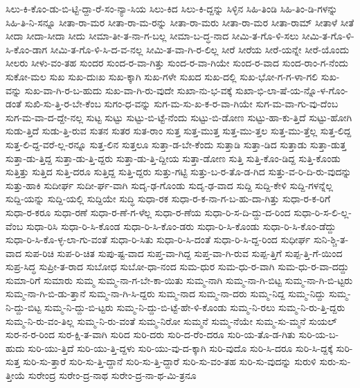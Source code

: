 {ಸಿಲು-ಕಿ-ಕೊಂ-ಡು-ಬಿ-ಟ್ಟಿ-ದ್ದಾ-ರೆ-ಸಂ-ನ್ಯಾ-ಸಿಯ
ಸಿಲು-ಕಿದ
ಸಿಲು-ಕಿ-ದ್ದನ್ನು
ಸಿಳ್ಳಿನ
ಸಿಹಿ-ತಿಂಡಿ
ಸಿಹಿ-ತಿಂ-ಡಿ-ಗಳನ್ನು
ಸಿಹಿ-ತಿ-ನಿ-ಸನ್ನೂ
ಸೀತಾ-ರಾ-ಮರ
ಸೀತಾ-ರಾ-ಮ-ರನ್ನು
ಸೀತಾ-ರಾ-ಮರು
ಸೀತಾ-ರಾ-ಮರ
ಸೀತಾ-ರಾಮ್
ಸೀತಾಳೆ
ಸೀತೆ
ಸೀದಾ
ಸೀದಾ-ಸೀದಾ
ಸೀದು
ಸೀಮಾ-ತೀ-ತ-ನಾ-ಗ-ಬಲ್ಲ
ಸೀಮಾ-ಬ-ದ್ಧ-ನಾದ
ಸೀಮಿ-ತ-ಗೊ-ಳಿ-ಸಲು
ಸೀಮಿ-ತ-ಗೊ-ಳಿ-ಸಿ-ಕೊಂ-ಡಾಗ
ಸೀಮಿ-ತ-ಗೊ-ಳಿ-ಸಿ-ದ-ವ-ನಲ್ಲ
ಸೀಮಿ-ತ-ವಾ-ಗಿ-ರ-ಲಿಲ್ಲ
ಸೀರೆ
ಸೀರೆಯ
ಸೀರೆ-ಯನ್ನೇ
ಸೀರೆ-ಯೊಂದು
ಸೀಲರು
ಸೀಳು-ವಂ-ತಹ
ಸುಂದರ
ಸುಂದ-ರ-ವಾ-ಗಿತ್ತು
ಸುಂದ-ರ-ವಾ-ಗಿಯೇ
ಸುಂದ-ರ-ವಾದ
ಸುಂದ-ರಾಂ-ಗ-ನೆಂದು
ಸುಕೋ-ಮಲ
ಸುಖ
ಸುಖ-ದುಃಖ
ಸುಖ-ಕ್ಕಾಗಿ
ಸುಖ-ಗಳೇ
ಸುಖದ
ಸುಖ-ದಲ್ಲಿ
ಸುಖ-ಭೋ-ಗ-ಗ-ಳಾ-ಗಲಿ
ಸುಖ-ವನ್ನು
ಸುಖ-ವಾ-ಗಿ-ರ-ಬ-ಹುದು
ಸುಖ-ವಾ-ಗಿ-ರು-ವುದೇ
ಸುಖಾ-ನು-ಭ-ವಕ್ಕೆ
ಸುಖಾ-ಭಿ-ಲಾ-ಷೆ-ಯ-ನ್ನೊ-ಳ-ಗೊಂ-ಡಂತೆ
ಸುಖಿ-ಸು-ತ್ತಿ-ರ-ಬೇ-ಕೆಂಬ
ಸುಗಂ-ಧ-ವನ್ನು
ಸುಗ-ಮ-ಸು-ಖ-ಕ-ರ-ವಾ-ಗಿಯೇ
ಸುಗ-ಮ-ವಾ-ಗು-ವು-ದೆಂಬ
ಸುಗ-ಮ-ವಾ-ದ-ದ್ದೇ-ನಲ್ಲ
ಸುಟ್ಟ
ಸುಟ್ಟು
ಸುಟ್ಟು-ಬಿ-ಟ್ಟೆ-ನೆಂದು
ಸುಟ್ಟು-ಬಿ-ಡೋಣ
ಸುಟ್ಟು-ಹಾ-ಕು-ತ್ತಿದೆ
ಸುಟ್ಟು-ಹೋಗಿ
ಸುಡು-ತ್ತಿದೆ
ಸುಡು-ತ್ತಿ-ರುವ
ಸುತನ
ಸುತರ
ಸುತ-ರಾಂ
ಸುತ್ತ
ಸುತ್ತ-ಮುತ್ತ
ಸುತ್ತ-ಮು-ತ್ತಲ
ಸುತ್ತ-ಮು-ತ್ತೆಲ್ಲ
ಸುತ್ತ-ಲಿದ್ದ
ಸುತ್ತ-ಲಿ-ದ್ದ-ವರೆ-ಲ್ಲ-ರನ್ನೂ
ಸುತ್ತ-ಲಿನ
ಸುತ್ತಲೂ
ಸುತ್ತಾ-ಡ-ಬೇ-ಕೆಂದು
ಸುತ್ತಾಡಿ
ಸುತ್ತಾ-ಡಿದ
ಸುತ್ತಾಡು
ಸುತ್ತಾ-ಡುತ್ತ
ಸುತ್ತಾ-ಡು-ತ್ತಿದ್ದ
ಸುತ್ತಾ-ಡು-ತ್ತಿ-ದ್ದರು
ಸುತ್ತಾ-ಡು-ತ್ತಿ-ದ್ದೀಯ
ಸುತ್ತಾ-ಡೋಣ
ಸುತ್ತಿ
ಸುತ್ತಿ-ಕೊಂ-ಡಿದ್ದ
ಸುತ್ತಿ-ಕೊಂಡು
ಸುತ್ತಿತ್ತು
ಸುತ್ತಿದ
ಸುತ್ತಿ-ದರೂ
ಸುತ್ತಿದ್ದ
ಸುತ್ತಿ-ದ್ದರು
ಸುತ್ತು-ಗಟ್ಟಿ
ಸುತ್ತು-ಬ-ರ-ತೊ-ಡ-ಗಿದ
ಸುತ್ತು-ವ-ರಿ-ದಿ-ರು-ವುದನ್ನು
ಸುತ್ತು-ಹಾಕಿ
ಸುದೀರ್ಘ
ಸುದೀ-ರ್ಘ-ವಾಗಿ
ಸುದೃ-ಢ-ಗೊಂಡು
ಸುದೃ-ಢ-ವಾದ
ಸುದ್ದಿ
ಸುದ್ದಿ-ಕೇಳಿ
ಸುದ್ದಿ-ಗಳನ್ನೆಲ್ಲ
ಸುದ್ದಿ-ಯನ್ನು
ಸುದ್ದಿ-ಯಲ್ಲಿ
ಸುದ್ದಿಯೇ
ಸುದ್ಧಿ
ಸುಧಾ-ರಕ
ಸುಧಾ-ರ-ಕ-ನಾ-ಗ-ಬ-ಹು-ದಾ-ಗಿತ್ತು
ಸುಧಾ-ರ-ಕ-ರಿಗೆ
ಸುಧಾ-ರ-ಕರೂ
ಸುಧಾ-ರಣೆ
ಸುಧಾ-ರ-ಣೆ-ಗ-ಳೆಲ್ಲ
ಸುಧಾ-ರ-ಣೆಯ
ಸುಧಾ-ರಿ-ಸ-ದಿ-ದ್ದು-ದ-ರಿಂದ
ಸುಧಾ-ರಿ-ಸ-ಲಿ-ಲ್ಲ-ವೆಂಬ
ಸುಧಾ-ರಿಸಿ
ಸುಧಾ-ರಿ-ಸಿ-ಕೊಂಡ
ಸುಧಾ-ರಿ-ಸಿ-ಕೊಂ-ಡರು
ಸುಧಾ-ರಿ-ಸಿ-ಕೊಂಡು
ಸುಧಾ-ರಿ-ಸಿ-ಕೊಂ-ಡೆದ್ದು
ಸುಧಾ-ರಿ-ಸಿ-ಕೊ-ಳ್ಳ-ಲಾ-ಗು-ವಂತೆ
ಸುಧಾ-ರಿ-ಸಿತು
ಸುಧಾ-ರಿ-ಸಿ-ದಂತೆ
ಸುಧಾ-ರಿ-ಸಿ-ದ್ದ-ರಿಂದ
ಸುಧೀರ್ಘ
ಸುನಿ-ಶ್ಚಿ-ತ-ವಾದ
ಸುಪ-ರಿಚಿ
ಸುಪ-ರಿ-ಚಿತ
ಸುಪು-ಷ್ಟ-ವಾದ
ಸುಪ್ತ-ವಾ-ಗಿದ್ದ
ಸುಪ್ತ-ವಾ-ಗಿ-ರುವ
ಸುಪ್ಪ-ತ್ತಿಗೆ
ಸುಪ್ಪ-ತ್ತಿ-ಗೆ-ಯಿಂದ
ಸುಪ್ರ-ಸಿದ್ಧ
ಸುಪ್ರೀ-ತ-ರಾದ
ಸುಬೋಧ
ಸುಬೋ-ಧಾ-ನಂದ
ಸುಮ-ಧುರ
ಸುಮ-ಧು-ರ-ವಾಗಿ
ಸುಮ-ಧು-ರ-ವಾ-ದದ್ದು
ಸುಮಾ-ರಿಗೆ
ಸುಮಾರು
ಸುಮ್ಮ
ಸುಮ್ಮ-ನಾ-ಗ-ಬೇ-ಕಾ-ಯಿತು
ಸುಮ್ಮ-ನಾಗಿ
ಸುಮ್ಮ-ನಾ-ಗಿ-ಬಿಟ್ಟ
ಸುಮ್ಮ-ನಾ-ಗಿ-ಬಿ-ಟ್ಟರು
ಸುಮ್ಮ-ನಾ-ಗಿ-ಬಿ-ಡು-ತ್ತಾನೆ
ಸುಮ್ಮ-ನಾ-ಗಿ-ಸಿ-ದ್ದರು
ಸುಮ್ಮ-ನಾದ
ಸುಮ್ಮ-ನಾ-ದರು
ಸುಮ್ಮ-ನಿದ್ದ
ಸುಮ್ಮ-ನಿದ್ದು
ಸುಮ್ಮ-ನಿ-ದ್ದು-ಬಿಟ್ಟ
ಸುಮ್ಮ-ನಿ-ದ್ದು-ಬಿ-ಟ್ಟರು
ಸುಮ್ಮ-ನಿ-ದ್ದು-ಬಿ-ಟ್ಟೆ-ಹೇ-ಳಿ-ಕೊಂಡು
ಸುಮ್ಮ-ನಿ-ರಲು
ಸುಮ್ಮ-ನಿ-ರು-ತ್ತಿ-ದ್ದರು
ಸುಮ್ಮ-ನಿ-ರು-ವಂ-ತಿಲ್ಲ
ಸುಮ್ಮ-ನಿ-ರು-ವಂತೆ
ಸುಮ್ಮ-ನಿರೋ
ಸುಮ್ಮನೆ
ಸುಮ್ಮ-ನೆಯೇ
ಸುಮ್ಮ-ಸು-ಮ್ಮನೆ
ಸುಯಲ್
ಸುರ-ನ-ರ-ರಿಂದ
ಸುರ-ಕ್ಷಿ-ತ-ವಾಗಿ
ಸುರಿದ
ಸುರಿ-ದರು
ಸುರಿ-ದ-ರೆಂ-ದರೂ
ಸುರಿ-ಯ-ತೊ-ಡ-ಗಿತು
ಸುರಿ-ಯ-ಬ-ಹುದು
ಸುರಿ-ಯು-ತ್ತಿದೆ
ಸುರಿ-ಯು-ತ್ತಿ-ದ್ದಳು
ಸುರಿ-ಯು-ವು-ದ-ಕ್ಕಾಗಿ
ಸುರಿ-ವುದೊ
ಸುರಿ-ಸಿ-ದರೂ
ಸುರಿ-ಸಿ-ದ್ದಕ್ಕೆ
ಸುರಿ-ಸುತ್ತ
ಸುರಿ-ಸು-ತ್ತಾರೆ
ಸುರಿ-ಸು-ತ್ತಿ-ದ್ದಾನೆ
ಸುರಿ-ಸು-ತ್ತಿ-ದ್ದಾರೆ
ಸುರಿ-ಸು-ವಂ-ತಹ
ಸುರಿ-ಸು-ವುದನ್ನು
ಸುರುಳಿ
ಸುರು-ಸು-ತ್ತೀಯೆ
ಸುರೇಂದ್ರ
ಸುರೇಂ-ದ್ರ-ನಾಥ
ಸುರೇಂ-ದ್ರ-ನಾ-ಥ-ಮಿ-ತ್ರನೂ
}
